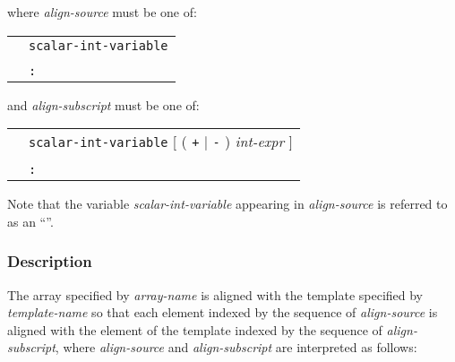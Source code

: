 where {\it align-source} must be one of:

\begin{tabular}{ll}
 \hspace{0.5cm} & {\tt scalar-int-variable} \\
 & {\tt *} \\
 & {\tt :} \\
\end{tabular}
\vspace{0.3cm}

and {\it align-subscript} must be one of:

\begin{tabular}{ll}
 \hspace{0.5cm} & {\tt scalar-int-variable} [ ( {\tt +} $\vert$ {\tt -} )
 {\it int-expr} ] \\
 & {\tt *} \\
 & {\tt :} \\
\end{tabular}
\vspace{0.3cm}

Note that the variable {\it scalar-int-variable} appearing in {\it
align-source} is referred to as an ``''.

\subsubsection*{Description}

The array specified by {\it array-name} is aligned with the template
specified by {\it template-name} so that each element indexed by the
sequence of {\it align-source} is aligned with the element of the
template indexed by the sequence of {\it align-subscript}, where {\it
align-source} and {\it align-subscript} are interpreted as follows:

